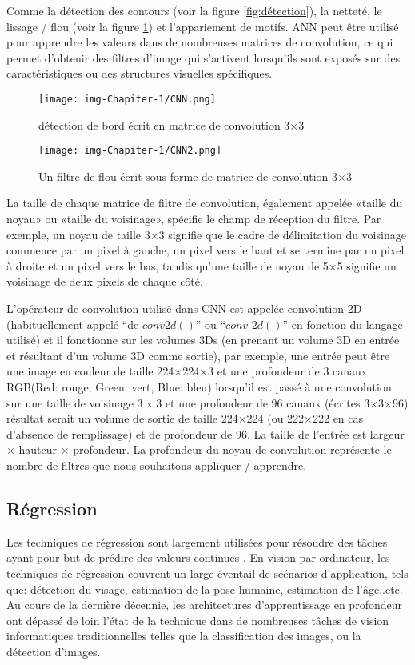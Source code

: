 \documentclass[12pt]{article}
\begin{document}
Comme la détection des contours (voir la figure \ref{fig:détection}), la netteté, le lissage / flou (voir la figure \ref{fig:filter}) et l’appariement de motifs. ANN peut être utilisé pour apprendre les valeurs dans de nombreuses matrices de convolution, ce qui permet d'obtenir des filtres d'image qui s'activent lorsqu'ils sont exposés sur des caractéristiques ou des structures visuelles spécifiques.
\begin{figure}[h]
	\centering
	\texttt{[image: img-Chapiter-1/CNN.png]}
	\caption{détection de bord écrit en matrice de convolution 3×3}
	\label{fig:détection}
	\bigbreak
	\centering
	\texttt{[image: img-Chapiter-1/CNN2.png]}
	\caption{Un filtre de flou écrit sous forme de matrice de convolution 3×3}
	\label{fig:filter}
\end{figure}

La taille de chaque matrice de filtre de convolution, également appelée «taille du noyau» ou «taille du voisinage», spécifie le champ de réception du filtre. Par exemple, un noyau de taille 3×3 signifie que le cadre de délimitation du voisinage commence par un pixel à gauche, un pixel vers le haut et se termine par un pixel à droite et un pixel vers le bas, tandis qu'une taille de noyau de 5×5 signifie un voisinage de deux pixels de chaque côté.

L'opérateur de convolution utilisé dans CNN est appelée convolution 2D (habituellement appelé “de $conv2d()$” ou “$conv\_2d()$” en fonction du langage utilisé) et il fonctionne sur les volumes 3Ds (en prenant un volume 3D en entrée et résultant d'un volume 3D comme sortie), par exemple, une entrée peut être une image en couleur de taille 224×224×3 \cite{43} et une profondeur de 3 canaux RGB(Red: rouge, Green: vert, Blue: bleu) lorsqu'il est passé à une convolution sur une taille de voisinage 3 x 3 et une profondeur de 96 canaux (écrites 3×3×96) résultat serait un volume de sortie de taille 224×224 (ou 222×222 en cas d'absence de remplissage) et de profondeur de 96. La taille de l'entrée est largeur × hauteur × profondeur. La profondeur du noyau de convolution représente le nombre de filtres que nous souhaitons appliquer / apprendre.

\subsection{Régression}
Les techniques de régression sont largement utilisées pour résoudre des tâches ayant pour but de prédire des valeurs continues \cite{44}. En vision par ordinateur, les techniques de régression couvrent un large éventail de scénarios d'application, tels que: détection du visage, estimation de la pose humaine, estimation de l'âge..etc. Au cours de la dernière décennie, les architectures d’apprentissage en profondeur ont dépassé de loin l’état de la technique dans de nombreuses tâches de vision informatiques traditionnelles telles que la classification des images, ou la détection d’images.
\end{document}
